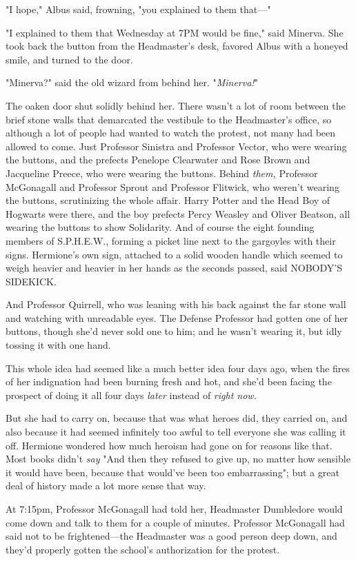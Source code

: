 "I hope," Albus said, frowning, "you explained to them that---"

"I explained to them that Wednesday at 7PM would be fine," said Minerva. She took back the button from the Headmaster's desk, favored Albus with a honeyed smile, and turned to the door.

"Minerva?" said the old wizard from behind her. "\emph{Minerva!}"

The oaken door shut solidly behind her.
\sbreak
There wasn't a lot of room between the brief stone walls that demarcated the vestibule to the Headmaster's office, so although a lot of people had wanted to watch the protest, not many had been allowed to come. Just Professor Sinistra and Professor Vector, who were wearing the buttons, and the prefects Penelope Clearwater and Rose Brown and Jacqueline Preece, who were wearing the buttons. Behind \emph{them,} Professor McGonagall and Professor Sprout and Professor Flitwick, who weren't wearing the buttons, scrutinizing the whole affair. Harry Potter and the Head Boy of Hogwarts were there, and the boy prefects Percy Weasley and Oliver Beatson, all wearing the buttons to show Solidarity. And of course the eight founding members of S.P.H.E.W., forming a picket line next to the gargoyles with their signs. Hermione's own sign, attached to a solid wooden handle which seemed to weigh heavier and heavier in her hands as the seconds passed, said NOBODY'S SIDEKICK.

And Professor Quirrell, who was leaning with his back against the far stone wall and watching with unreadable eyes. The Defense Professor had gotten one of her buttons, though she'd never sold one to him; and he wasn't wearing it, but idly tossing it with one hand.

This whole idea had seemed like a much better idea four days ago, when the fires of her indignation had been burning fresh and hot, and she'd been facing the prospect of doing it all four days \emph{later} instead of \emph{right now.}

But she had to carry on, because that was what heroes did, they carried on, and also because it had seemed infinitely too awful to tell everyone she was calling it off. Hermione wondered how much heroism had gone on for reasons like that. Most books didn't \emph{say} "And then they refused to give up, no matter how sensible it would have been, because that would've been too embarrassing"; but a great deal of history made a lot more sense that way.

At 7:15pm, Professor McGonagall had told her, Headmaster Dumbledore would come down and talk to them for a couple of minutes. Professor McGonagall had said not to be frightened---the Headmaster was a good person deep down, and they'd properly gotten the school's authorization for the protest.

